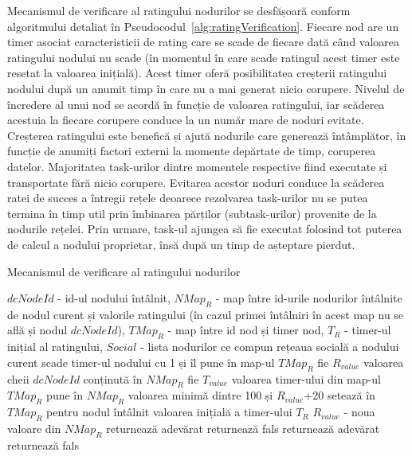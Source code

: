 \documentclass[12pt,a4paper]{report}
\begin{document}
Mecanismul de verificare al ratingului nodurilor se desfășoară conform algoritmului detaliat în Pseudocodul~\ref{alg:ratingVerification}. Fiecare nod are un timer asociat caracteristicii de rating care se scade de fiecare dată când valoarea ratingului nodului nu scade (în momentul în care scade ratingul acest timer este resetat la valoarea inițială). Acest timer oferă posibilitatea creșterii ratingului nodului după un anumit timp în care nu a mai generat nicio corupere. Nivelul de încredere al unui nod se acordă în funcție de valoarea ratingului, iar scăderea acestuia la fiecare corupere conduce la un număr mare de noduri evitate. Creșterea ratingului este benefică și ajută nodurile care generează întâmplător, în funcție de anumiți factori externi la momente depărtate de timp, coruperea datelor. Majoritatea task-urilor dintre momentele respective fiind executate și transportate fără nicio corupere. Evitarea acestor noduri conduce la scăderea ratei de succes a întregii rețele deoarece rezolvarea task-urilor nu se putea termina în timp util prin îmbinarea părților (subtask-urilor) provenite de la nodurile rețelei. Prin urmare, task-ul ajungea să fie executat folosind tot puterea de calcul a nodului proprietar, însă după un timp de așteptare pierdut. 
\begin{algorithm}
\caption{Mecanismul de verificare al ratingului nodurilor}
\label{alg:ratingVerification}
\begin{algorithmic}[1]
\scriptsize
\State $dcNodeId$ - id-ul nodului întâlnit, $NMap_R$ - map între id-urile nodurilor întâlnite de nodul curent și valorile ratingului (în cazul primei întâlniri în acest map nu se află și nodul $dcNodeId$), $TMap_R$ - map între id nod și timer nod, $T_R$ - timer-ul inițial al ratingului, $Social$ - lista nodurilor ce compun rețeaua socială a nodului curent
		\State scade timer-ul nodului cu 1 și îl pune în map-ul $TMap_R$
		\State fie $R_{value}$ valoarea cheii $dcNodeId$ conținută în $NMap_R$
		\State fie $T_{value}$ valoarea timer-ului din map-ul $TMap_R$ 
				\State pune în $NMap_R$ valoarea minimă dintre 100 și $R_{value}$+20
				\State setează în $TMap_R$ pentru nodul întâlnit valoarea inițială a timer-ului $T_R$ 
		\EndIf
		\State $R_{value}$ - noua valoare din $NMap_R$
			\State returnează adevărat
		\Else {} returnează fals
		\EndIf
	\EndIf
		\State returnează adevărat
	\Else {} returnează fals
	\EndIf
\end{algorithmic}
\end{algorithm}
\end{document}
